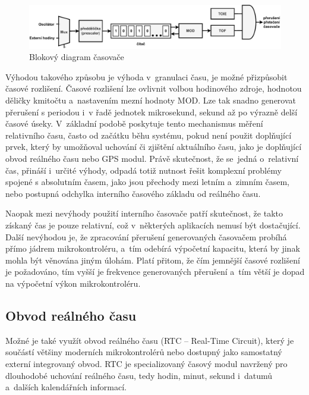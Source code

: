 \begin{figure}[h]
    \centering
    \includegraphics[width=1.00\textwidth]{obrazky-figures/timer-cz.pdf}
    
    \caption{Blokový diagram časovače~\cite{nxp_KL05_Reference_Manual}}
    \label{fig:timer}
\end{figure}

Výhodou takového způsobu je výhoda v~granulaci času, je možné přizpůsobit časové rozlišení. Časové rozlišení lze ovlivnit volbou hodinového zdroje, hodnotou děličky kmitočtu a~nastavením mezní hodnoty MOD. Lze tak snadno generovat přerušení s periodou i~v řadě jednotek mikrosekund, sekund až po výrazně delší časové úseky. V~základní podobě poskytuje tento mechanismus měření relativního času, často od začátku běhu systému, pokud není použit doplňující prvek, který by umožňoval uchování či zjištění aktuálního času, jako je doplňující obvod reálného času nebo GPS modul. Právě skutečnost, že se~jedná o~relativní čas, přináší i~určité výhody, odpadá totiž nutnost řešit komplexní problémy spojené s absolutním časem, jako jsou přechody mezi letním a~zimním časem, nebo postupná odchylka interního časového základu od reálného času.~\cite{perny2008zarizeni_cas_znacky}

Naopak mezi nevýhody použití interního časovače patří skutečnost, že takto získaný čas je pouze relativní, což v~některých aplikacích nemusí být dostačující. Další nevýhodou je, že zpracování přerušení generovaných časovačem probíhá přímo jádrem mikrokontroléru, a~tím odebírá výpočetní kapacitu, která by jinak mohla být věnována jiným úlohám. Platí přitom, že čím jemnější časové rozlišení je požadováno, tím vyšší je frekvence generovaných přerušení a~tím větší je dopad na výpočetní výkon mikrokontroléru.~\cite{perny2008zarizeni_cas_znacky}

\subsection{Obvod reálného času}
\label{real_time_circuit}
Možné je také využít obvod reálného času (RTC -- Real-Time Circuit), který je součástí většiny moderních mikrokontrolérů nebo dostupný jako samostatný externí integrovaný obvod. RTC je specializovaný časový modul navržený pro dlouhodobé uchování reálného času, tedy hodin, minut, sekund i~datumů a~dalších kalendářních informací.

